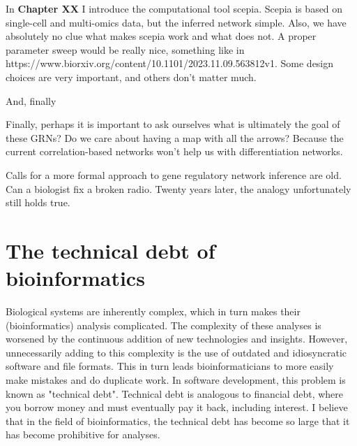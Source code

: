 In \textbf{Chapter XX} I introduce the computational tool scepia. Scepia is based on single-cell and multi-omics data, but the inferred network simple. Also, we have absolutely no clue what makes scepia work and what does not. A proper parameter sweep would be really nice, something like in https://www.biorxiv.org/content/10.1101/2023.11.09.563812v1. Some design choices are very important, and others don't matter much.

And, finally

Finally, perhaps it is important to ask ourselves what is ultimately the goal of these GRNs? Do we care about having a map with all the arrows? Because the current correlation-based networks won't help us with differentiation networks. 

Calls for a more formal approach to gene regulatory network inference are old. Can a biologist fix a broken radio\cite{Lazebnik2002}. Twenty years later, the analogy unfortunately still holds true.

\section{The technical debt of bioinformatics}

Biological systems are inherently complex, which in turn makes their (bioinformatics) analysis complicated. The complexity of these analyses is worsened by the continuous addition of new technologies and insights. However, unnecessarily adding to this complexity is the use of outdated and idiosyncratic software and file formats. This in turn leads bioinformaticians to more easily make mistakes and do duplicate work. In software development, this problem is known as "technical debt". Technical debt is analogous to financial debt, where you borrow money and must eventually pay it back, including interest. I believe that in the field of bioinformatics, the technical debt has become so large that it has become prohibitive for analyses.


